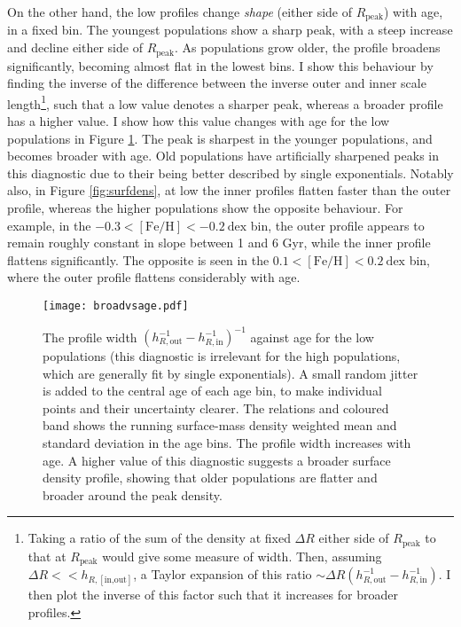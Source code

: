 On the other hand, the low \afe{} profiles change \emph{shape} (either side of $R_{\mathrm{peak}}$) with age, in a fixed \feh{} bin. The youngest populations show a sharp peak, with a steep increase and decline either side of $R_{\mathrm{peak}}$. As populations grow older, the profile broadens significantly, becoming almost flat in the lowest \feh{} bins. I show this behaviour by finding the inverse of the difference between the inverse outer and inner scale length\footnote{Taking a ratio of the sum of the density at fixed $\Delta R$ either side of $R_{\mathrm{peak}}$ to that at $R_{\mathrm{peak}}$ would give some measure of width. Then, assuming $\Delta R << h_{R,[\text{in,out}]}$, a Taylor expansion of this ratio $\sim \Delta R (h_{R,\text{out}}^{-1}-h_{R,\text{in}}^{-1})$. I then plot the inverse of this factor such that it increases for broader profiles.}, such that a low value denotes a sharper peak, whereas a broader profile has a higher value. I show how this value changes with age for the low \afe{} populations in Figure \ref{fig:agevsbroadening}. The peak is sharpest in the younger populations, and becomes broader with age. Old populations have artificially sharpened peaks in this diagnostic due to their being better described by single exponentials. Notably also, in Figure \ref{fig:surfdens}, at low \feh{} the inner profiles flatten faster than the outer profile, whereas the higher \feh{} populations show the opposite behaviour. For example, in the $-0.3 < \mathrm{[Fe/H]} < -0.2\ \mathrm{dex}$ bin, the outer profile appears to remain roughly constant in slope between 1 and 6 Gyr, while the inner profile flattens significantly. The opposite is seen in the $0.1 < \mathrm{[Fe/H]} < 0.2\ \mathrm{dex}$ bin, where the outer profile flattens considerably with age. 

 \begin{figure}
 	\texttt{[image: broadvsage.pdf]}
     \caption[The broadening of surface density profiles as a function of age in the low \afe{} mono-age, mono-\feh{} populations]{The profile width $(h_{R,\mathrm{out}}^{-1} - h_{R,\mathrm{in}}^{-1})^{-1}$ against age for the low \afe{} populations (this diagnostic is irrelevant for the high \afe{} populations, which are generally fit by single exponentials). A small random jitter is added to the central age of each age bin, to make individual points and their uncertainty clearer. The relations and coloured band shows the running surface-mass density weighted mean and standard deviation in the age bins. The profile width increases with age. A higher value of this diagnostic suggests a broader surface density profile, showing that older populations are flatter and broader around the peak density.}
     \label{fig:agevsbroadening}
 \end{figure}


